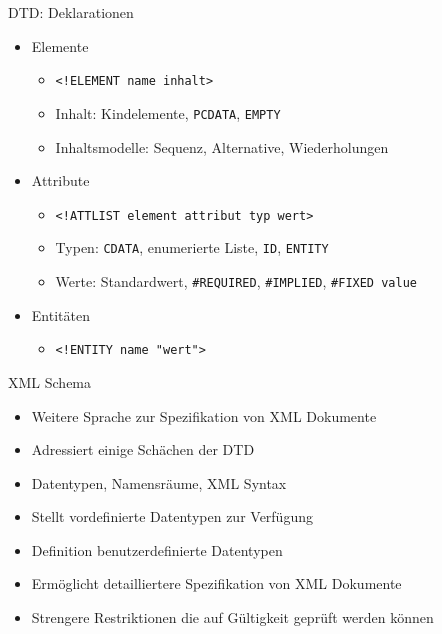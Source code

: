 \documentclass{beamer}
\begin{document}
\begin{frame}{DTD: Deklarationen}
	
	\begin{itemize}
		\item Elemente
		\begin{itemize}
			\item \texttt{<!ELEMENT name inhalt>}
			\item Inhalt: Kindelemente, \texttt{PCDATA}, \texttt{EMPTY}
			\item Inhaltsmodelle: Sequenz, Alternative, Wiederholungen
		\end{itemize}
		\item Attribute
		\begin{itemize}
			\item \texttt{<!ATTLIST element attribut typ wert>}
			\item Typen: \texttt{CDATA}, enumerierte Liste, \texttt{ID}, \texttt{ENTITY}
			\item Werte: Standardwert, \texttt{\#REQUIRED}, \texttt{\#IMPLIED}, \texttt{\#FIXED value}
		\end{itemize}
		\item Entitäten
		\begin{itemize}
			\item \texttt{<!ENTITY name "wert">}
		\end{itemize}
	\end{itemize}
	
\end{frame}

\begin{frame}{XML Schema}
	
	\begin{itemize}
		\item Weitere Sprache zur Spezifikation von XML Dokumente
		\item Adressiert einige Schächen der DTD
		\item Datentypen, Namensräume, XML Syntax
		\item Stellt vordefinierte Datentypen zur Verfügung
		\item Definition benutzerdefinierte Datentypen
		\item Ermöglicht detailliertere Spezifikation von XML Dokumente
		\item Strengere Restriktionen die auf Gültigkeit geprüft werden können
	\end{itemize}
	
\end{frame}
\end{document}
